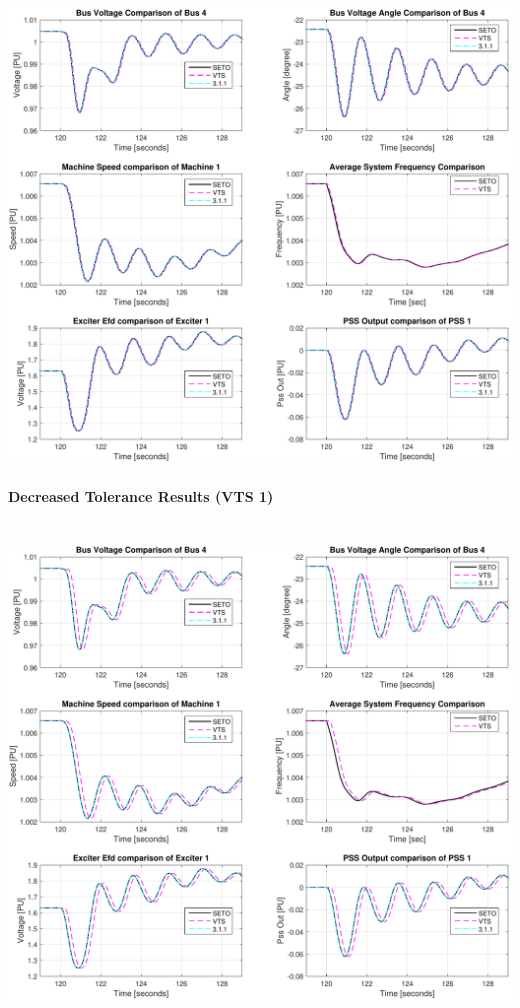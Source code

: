 \documentclass[12pt]{article}
\begin{document}
\includegraphics[width=\linewidth]{verCompDetail2}

\pagebreak
\paragraph{Decreased Tolerance Results (VTS 1)} \ \\

\includegraphics[width=\linewidth]{verCompDetail2ALT1}
\end{document}
